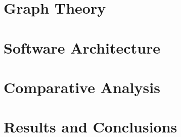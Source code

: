 \documentclass[12pt,a4paper,twoside]{book}
\begin{document}
	\chapter{Graph Theory}
	\thispagestyle{chapterplain}
	\label{chap:graphtheory}
	
	\clearpage{\pagestyle{empty}\cleardoublepage}
	
	\chapter{Software Architecture}
	\thispagestyle{chapterplain}
	\label{chap:softwarearchitecture}
	
	\clearpage{\pagestyle{empty}\cleardoublepage}
	
	\chapter{Comparative Analysis}
	\thispagestyle{chapterplain}
	\label{chap:comparativeanalysis}
	
	\clearpage{\pagestyle{empty}\cleardoublepage}
	
	\chapter{Results and Conclusions}
	\thispagestyle{chapterplain}
	\label{chap:resultsandconclusions}
	
	\clearpage{\pagestyle{empty}\cleardoublepage}
	
	\pagestyle{plain}
	\cleardoublepage
	\setcounter{page}{1}
	\renewcommand{\thepage}{B\arabic{page}}
	
	
	
\end{document}
